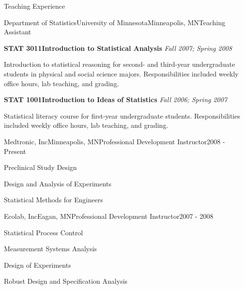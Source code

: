 \documentclass{resume} %
\begin{document}
\begin{rSection}{Teaching Experience}
	\begin{rSubsection}{Department of Statistics\textemdash University of Minnesota}{Minneapolis, MN}{Teaching Assistant}{}
		\item[] \textbf{STAT 3011\textemdash Introduction to Statistical Analysis} \hfill \textit{Fall 2007; Spring 2008}
		\item[] Introduction to statistical reasoning for second- and third-year undergraduate students in physical and social science majors. Responsibilities included weekly office hours, lab teaching, and grading. \vspace{0.5em}
		\item[] \textbf{STAT 1001\textemdash Introduction to Ideas of Statistics} \hfill \textit{Fall 2006; Spring 2007}
		\item[] Statistical literacy course for first-year undergraduate students. Responsibilities included weekly office hours, lab teaching, and grading.
		
	\end{rSubsection}


	
		
	\begin{rSubsection}{Medtronic, Inc}{Minneapolis, MN}{Professional Development Instructor}{2008 - Present}
		\item[] Preclinical Study Design
		\item[] Design and Analysis of Experiments
		\item[] Statistical Methods for Engineers
		
	\end{rSubsection}
	
	
	\begin{rSubsection}{Ecolab, Inc}{Eagan, MN}{Professional Development Instructor}{2007 - 2008}
		\item[] Statistical Process Control
		\item[] Measurement Systems Analysis
		\item[] Design of Experiments
		\item[] Robust Design and Specification Analysis
		
	\end{rSubsection}
	
	
	

\end{rSection}
\end{document}
